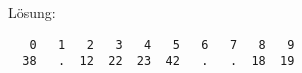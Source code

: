 \ifprintanswers
Lösung:
\begin{lstlisting}
   0   1   2   3   4   5   6   7   8   9
  38   .  12  22  23  42   .   .  18  19
\end{lstlisting}
\fi

